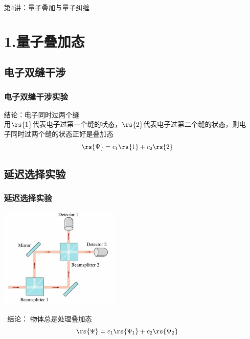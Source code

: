 

\begin{frame} [plain]
    \frametitle{}
    \Background[1] 
    \begin{center}
    {\huge 第4讲：量子叠加与量子纠缠}
    \end{center}  
    \addtocounter{framenumber}{-1}   
\end{frame}

\section{1.量子叠加态}
\subsection{电子双缝干涉}
\begin{frame} 
    \frametitle{电子双缝干涉实验}
\end{frame} 

\begin{frame} 
    结论：电子同时过两个缝\\ \vspace{0.6em}
用$\rs{1}$代表电子过第一个缝的状态，$\rs{2}$代表电子过第二个缝的状态，则电子同时过两个缝的状态正好是叠加态
\[\rs{\Psi}=c_1\rs{1}+c_2\rs{2}\]
\end{frame} 

\subsection{延迟选择实验}
\begin{frame} 
    \frametitle{延迟选择实验}
    \begin{center}
        \includegraphics[width=0.45\textwidth]{figs/27.png}
    \end{center}
    {\Bullet}~结论： 物体总是处理叠加态\[\rs{\Psi}=c_1\rs{\Psi_1}+c_2\rs{\Psi_2}\]
\end{frame}

